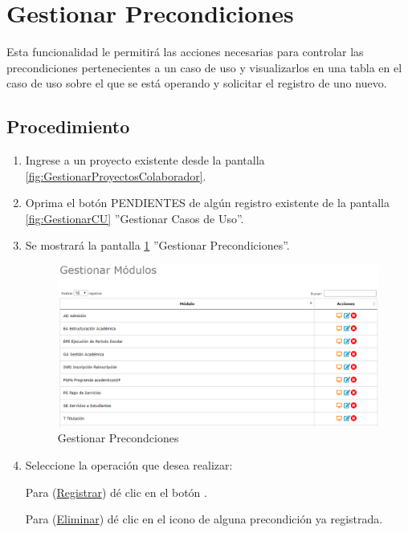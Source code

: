 \hypertarget{cv:GestionarPrecondiciones}{\section{Gestionar Precondiciones}} \label{sec:GestionarPrecondiciones}

	Esta funcionalidad le permitirá las acciones necesarias para controlar las precondiciones pertenecientes a un caso de uso y visualizarlos en una tabla en el caso de uso sobre el que se está operando y solicitar el registro de uno nuevo.

		\subsection{Procedimiento}

			\begin{enumerate}
				
			\item Ingrese a un proyecto existente desde la pantalla \ref{fig:GestionarProyectosColaborador}.
			
			\item Oprima el botón PENDIENTES de algún registro existente de la pantalla \ref{fig:GestionarCU} ''Gestionar Casos de Uso''.
	
			\item Se mostrará la pantalla \ref{fig:GestionarPrecondiciones} ''Gestionar Precondiciones''.

			\begin{figure}[htbp!]
				\begin{center}
					\includegraphics[scale=0.6]{roles/lider/casosUso/pantallas/IU5gestionarModulos}
					\caption{Gestionar Precondciones}
					\label{fig:GestionarPrecondiciones}
				\end{center}
			\end{figure}
		
				\item Seleccione la operación que desea realizar:
			
			Para (\hyperlink{cv:registrarPrecondicion}{Registrar}) dé clic en el botón \IURegistrar.
			
			Para (\hyperlink{cv:eliminarPrecondicion}{Eliminar}) dé clic en el icono \IUBotonEliminar{} de alguna precondición ya registrada.
			
			\end{enumerate}